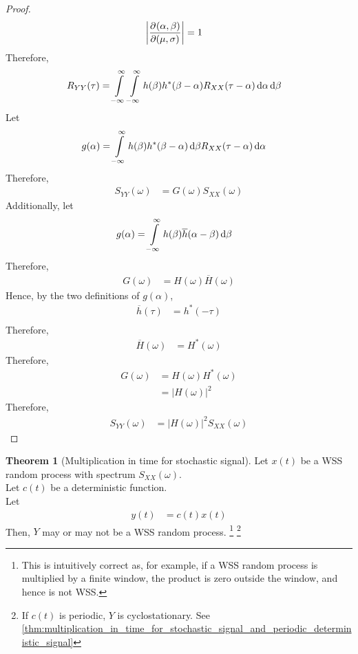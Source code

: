 \documentclass[titlepage, fleqn, a4paper, 12pt, twoside]{article}
\theoremstyle{definition}
\theoremstyle{theorem}
\newtheorem{theorem}{Theorem}
\begin{document}
\begin{proof}
\begin{align*}
		\left| \dpd{(\alpha,\beta)}{(\mu,\sigma)} \right| &= 1
	\end{align*}
	Therefore,
	\begin{align*}
		R_{Y Y}(\tau) &= \int\limits_{-\infty}^{\infty} \int\limits_{-\infty}^{\infty} h(\beta) h^*(\beta - \alpha) R_{X X}(\tau - \alpha) \dif \alpha \dif \beta
	\end{align*}
	Let
	\begin{align*}
		g(\alpha) &= \int\limits_{-\infty}^{\infty} h(\beta) h^*(\beta - \alpha) \dif \beta R_{X X}(\tau - \alpha) \dif \alpha
	\end{align*}
	Therefore,
	\begin{align*}
		S_{Y Y}(\omega) &= G(\omega) S_{X X}(\omega)
	\end{align*}
	Additionally, let
	\begin{align*}
		g(\alpha) &= \int\limits_{-\infty}^{\infty} h(\beta) \overline{h}(\alpha - \beta) \dif \beta
	\end{align*}
	Therefore,
	\begin{align*}
		G(\omega) &= H(\omega) \overline{H}(\omega)
	\end{align*}
	Hence, by the two definitions of $g(\alpha)$,
	\begin{align*}
		\overline{h}(\tau) &= h^*(-\tau)\\
	\end{align*}
	Therefore,
	\begin{align*}
		\overline{H}(\omega) &= H^*(\omega)
	\end{align*}
	Therefore,
	\begin{align*}
		G(\omega) &= H(\omega) H^*(\omega)\\
		&= \left| H(\omega) \right|^2
	\end{align*}
	Therefore,
	\begin{align*}
		S_{Y Y}(\omega) &= \left| H(\omega) \right|^2 S_{X X}(\omega)
	\end{align*}
\end{proof}

\begin{theorem}[Multiplication in time for stochastic signal]
	Let $x(t)$ be a WSS random process with spectrum $S_{X X}(\omega)$.\\
	Let $c(t)$ be a deterministic function.\\
	Let
	\begin{align*}
		y(t) &= c(t) x(t)
	\end{align*}
	Then, $Y$ may or may not be a WSS random process.
	\footnote{This is intuitively correct as, for example, if a WSS random process is multiplied by a finite window, the product is zero outside the window, and hence is not WSS.}
	\footnote{If $c(t)$ is periodic, $Y$ is cyclostationary. See \cref{thm:multiplication_in_time_for_stochastic_signal_and_periodic_deterministic_signal}}
	\label{thm:multiplication_in_time_for_stochastic_signal_and_deterministic_signal}
\end{theorem}
\end{document}
